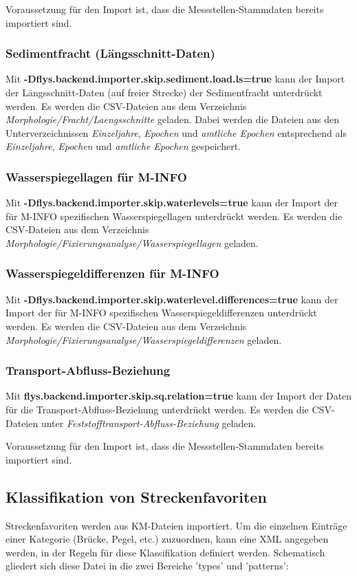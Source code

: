 Voraussetzung für den Import ist, dass die Messstellen-Stammdaten
bereits importiert sind.

\subsubsection{Sedimentfracht (Längsschnitt-Daten)}
Mit
\textbf{-Dflys.backend.importer.skip.sediment.load.ls=true}
kann der Import der Längsschnitt-Daten (auf freier Strecke)
der Sedimentfracht unterdrückt werden.
Es werden die CSV-Dateien aus dem Verzeichnis
\textit{Morphologie/Fracht/Laengsschnitte} geladen.
Dabei werden die Dateien aus den
Unterverzeichnissen \textit{Einzeljahre}, \textit{Epochen}
und \textit{amtliche Epochen} entsprechend als
\textit{Einzeljahre}, \textit{Epochen} und
\textit{amtliche Epochen} gespeichert.

\subsubsection{Wasserspiegellagen für M-INFO}
Mit \textbf{-Dflys.backend.importer.skip.waterlevels=true}
kann der Import der für M-INFO spezifischen Wasserspiegellagen
unterdrückt werden. Es werden die CSV-Dateien aus dem Verzeichnis
\textit{Morphologie/Fixierungsanalyse/Wasserspiegellagen} geladen.

\subsubsection{Wasserspiegeldifferenzen für M-INFO}
Mit \textbf{-Dflys.backend.importer.skip.waterlevel.differences=true}
kann der Import der für M-INFO spezifischen Wasserspiegeldifferenzen
unterdrückt werden. Es werden die CSV-Dateien aus dem Verzeichnis
\textit{Morphologie/Fixierungsanalyse/Wasserspiegeldifferenzen} geladen.

\subsubsection{Transport-Abfluss-Beziehung}
Mit \textbf{flys.backend.importer.skip.sq.relation=true}
kann der Import der Daten für die Transport-Abfluss-Beziehung
unterdrückt werden. Es werden die CSV-Dateien unter
\textit{Feststofftransport-Abfluss-Beziehung} geladen.

Voraussetzung für den Import ist, dass die Messstellen-Stammdaten
bereits importiert sind.

\subsection{Klassifikation von Streckenfavoriten}
\label{annotation-types}
Streckenfavoriten werden aus KM-Dateien importiert. Um die einzelnen Einträge
einer Kategorie (Brücke, Pegel, etc.) zuzuordnen, kann eine XML angegeben werden,
in der Regeln für diese Klassifikation definiert werden. Schematisch gliedert
sich diese Datei in die zwei Bereiche 'types' und 'patterns':

